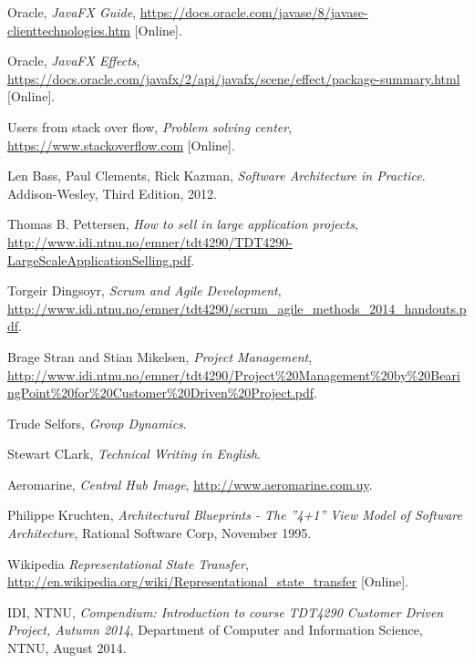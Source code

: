 \documentclass[../document]{subfiles}
\begin{document}
\begin{thebibliography}{1}
\label{Bibliography}

Oracle,
{\em JavaFX Guide},
\url{https://docs.oracle.com/javase/8/javase-clienttechnologies.htm} [Online].

Oracle,
{\em JavaFX Effects},
\url{https://docs.oracle.com/javafx/2/api/javafx/scene/effect/package-summary.html} [Online].

Users from stack over flow, 
{\em Problem solving center},
\url{https://www.stackoverflow.com} [Online].

Len Bass, Paul Clements, Rick Kazman,
{\em Software Architecture in Practice}.
Addison-Wesley,
Third Edition,
2012.

Thomas B. Pettersen, 
{\em How to sell in large application projects},
\url{http://www.idi.ntnu.no/emner/tdt4290/TDT4290-LargeScaleApplicationSelling.pdf}.

Torgeir Dingsoyr, 
{\em Scrum and Agile Development},
\url{http://www.idi.ntnu.no/emner/tdt4290/scrum_agile_methods_2014_handouts.pdf}.

Brage Stran and Stian Mikelsen, 
{\em Project Management},
\url{http://www.idi.ntnu.no/emner/tdt4290/Project%20Management%20by%20BearingPoint%20for%20Customer%20Driven%20Project.pdf}.

Trude Selfors, 
{\em Group Dynamics}.

Stewart CLark, 
{\em Technical Writing in English}.

Aeromarine,
{\em Central Hub Image},
\url{http://www.aeromarine.com.uy}.


 Philippe Kruchten, {\em Architectural Blueprints - The ''4+1'' View Model of Software Architecture}, Rational Software Corp, November 1995.

Wikipedia {\em Representational State Transfer}, \url{http://en.wikipedia.org/wiki/Representational_state_transfer} [Online].

 IDI, NTNU, {\em Compendium: Introduction to course TDT4290 Customer Driven Project, Autumn 2014}, Department of Computer and Information Science, NTNU,  August 2014.


\end{thebibliography}
\end{document}
